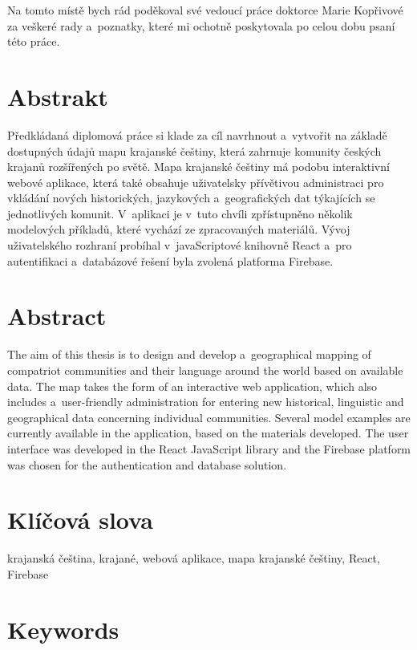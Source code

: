 \documentclass[a4paper,12pt,openany,twoside]{book} %
\begin{document}
Na tomto místě bych rád poděkoval své vedoucí práce doktorce Marie Kopřivové za veškeré rady a~poznatky, které mi ochotně poskytovala po celou dobu psaní této práce.

\clearpage

\section*{Abstrakt}

Předkládaná diplomová práce si klade za cíl navrhnout a~vytvořit na základě dostupných údajů mapu krajanské češtiny, která zahrnuje komunity českých krajanů rozšířených po světě. Mapa krajanské češtiny má podobu interaktivní webové aplikace, která také obsahuje uživatelsky přívětivou administraci pro vkládání nových historických, jazykových a~geografických dat týkajících se jednotlivých komunit. V~aplikaci je v~tuto chvíli zpřístupněno několik modelových příkladů, které vychází ze zpracovaných materiálů. Vývoj uživatelského rozhraní probíhal v~javaScriptové knihovně React a~pro autentifikaci a~databázové řešení byla zvolená platforma Firebase.

\section*{Abstract}

The aim of this thesis is to design and develop a~geographical mapping of compatriot communities and their language around the world based on available data. The map takes the form of an interactive web application, which also includes a~user-friendly administration for entering new historical, linguistic and geographical data concerning individual communities. Several model examples are currently available in the application, based on the materials developed. The user interface was developed in the React JavaScript library and the Firebase platform was chosen for the authentication and database solution.

\section*{Klíčová slova}

krajanská čeština, krajané, webová aplikace, mapa krajanské češtiny, React, Firebase

\section*{Keywords}
\end{document}

